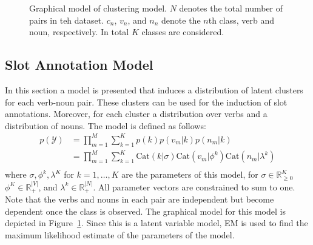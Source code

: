 \documentclass[11pt]{scrartcl}
\newcommand{\Cat}{\text{Cat}}
\begin{document}
\begin{figure}
\centering
{}
\caption{Graphical model of clustering model. $N$ denotes the total
number of pairs in teh dataset. $c_n$, $v_n$, and $n_n$ denote the
$n$th class, verb and noun, respectively. In total $K$ classes are
considered.}
\label{fig:graphmodel}
\end{figure}


\subsection{Slot Annotation Model} %
\label{sec:verbclasses}
In this section a model is presented that induces a distribution of
latent clusters for each verb-noun pair. These clusters can be
used for the induction of slot annotations. Moreover, for each cluster a distribution over verbs and a distribution of nouns. The
model is defined as follows:
\begin{align*}
  p(\mathcal{Y})
  &= \prod_{m=1}^M \sum_{k=1}^K p(k)p(v_m|k)p(n_m|k) \\
  &= \prod_{m=1}^M \sum_{k=1}^K \Cat(k|\sigma)\Cat(v_m|\phi^k)\Cat(n_m|\lambda^k) \\
\end{align*}
where $\sigma, \phi^k, \lambda^K$ for $k=1,\ldots,K$ are the
parameters of this model, for $\sigma \in \mathbb{R}_{\ge 0}^K$ $\phi^K \in
\mathbb{R}_+^{|V|}$, and $\lambda^k \in \mathbb{R}_+^{|N|}$. All
parameter vectors are constrained to sum to one. Note that the verbs
and nouns in each pair are independent but become dependent once the
class is observed. The graphical model for this model is depicted in
Figure~\ref{fig:graphmodel}. Since this is a latent variable model, EM
is used to find the maximum likelihood estimate of the parameters of
the model.
\end{document}
